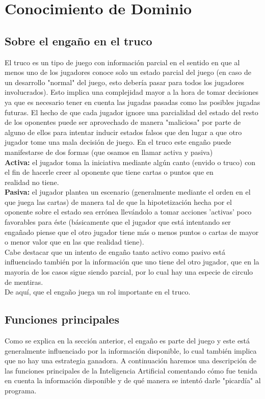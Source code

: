 \documentclass[12pt,a4paper]{article}
\begin{document}
\section{Conocimiento de Dominio}

\subsection{Sobre el enga\~no en el truco}

El truco es un tipo de juego con informaci\'on parcial en el sentido en que al menos uno de los jugadores
conoce solo un estado parcial del juego (en caso de un desarrollo "normal" del juego, esto deber\'ia 
pasar para todos los jugadores involucrados). Esto implica una complejidad mayor a la hora de tomar decisiones
ya que es necesario tener en cuenta las jugadas pasadas como las posibles jugadas futuras. 
El hecho de que cada jugador ignore una parcialidad del estado del resto de los oponentes puede ser aprovechado
de manera "maliciosa" por parte de alguno de ellos para intentar inducir estados falsos que den lugar a que otro jugador
tome una mala decisi\'on de juego. En el truco este enga\~no puede manifestarse de dos formas (que osamos en llamar
activa y pasiva)\\
\textbf{Activa:} el jugador toma la iniciativa mediante alg\'un canto (envido o truco) con el fin de hacerle creer al oponente que tiene
cartas o puntos que en \\ realidad no tiene.\\
\textbf{Pasiva:} el jugador plantea un escenario (generalmente mediante el orden en el que juega las cartas) de manera tal de que 
la hipotetizaci\'on hecha por el oponente sobre el estado sea err\'onea llev\'andolo a tomar acciones 'activas' poco favorables para 
\'este (b\'asicamente que el jugador que est\'a intentando ser enga\~nado piense que el otro jugador tiene m\'as o menos puntos o cartas de 
mayor o menor valor que en las que realidad tiene).\\
Cabe destacar que un intento de enga\~no tanto activo como pasivo est\'a influenciado tambi\'en por la informaci\'on que uno tiene del otro jugador,
que en la mayoria de los casos sigue siendo parcial,  por lo cual hay una especie de circulo de mentiras.\\
De aqu\'i, que el enga\~no juega un rol importante en el truco.

\subsection{Funciones principales}
Como se explica en la secci\'on anterior, el enga\~no es parte del juego y este est\'a generalmente influenciado por
la informaci\'on disponible, lo cual tambi\'en implica que no hay una estrategia ganadora. 
A continuaci\'on haremos una descripci\'on de las funciones principales de la Inteligencia Artificial comentando c\'omo fue tenida en cuenta la 
informaci\'on disponible y de qu\'e manera se intent\'o darle "picard\'ia" al programa.
\end{document}
